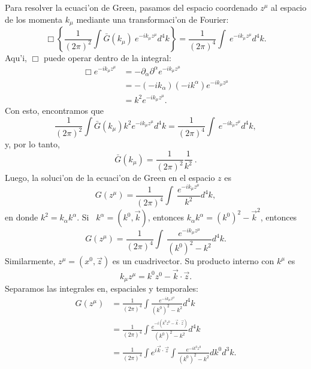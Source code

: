  Para resolver la ecuaci'on de Green, pasamos del espacio
 coordenado $z^\mu $ al espacio de los momenta $k_\mu $ mediante
 una transformaci'on
 de Fourier:%
 \begin{equation}
 \Box\left\{  \frac{1}{(2\pi)
 ^2}\int\bar{G}\left( k_\mu \right)
 ~e^{-ik_\mu z^\mu }d^4k\right\}  =\frac{1}{\left( 2\pi\right)
 ^4}\int~e^{-ik_\mu z^\mu }d^4k.
 \end{equation}
 Aqu'i, $\Box$ puede operar dentro de la integral:%
 \begin{align*}
 \Box e^{-ik_\mu z^\mu }  &
 =-\partial_{\alpha}\partial^{\alpha}e^{-ik_\mu z^\mu }\\
 & =-\left(  -ik_{\alpha}\right)  \left(
 -ik^{\alpha}\right)e^{-ik_\mu z^\mu }\\
 & =k^2e^{-ik_\mu z^\mu }.
 \end{align*}
 Con esto, encontramos que
 \begin{equation}
 \frac{1}{(2\pi)  ^2}\int\bar{G}\left(k_\mu \right)
 k^2e^{-ik_\mu z^\mu }d^4k=\frac{1}{(2\pi)  ^4}%
 \int~e^{-ik_\mu z^\mu }d^4k,
 \end{equation}
 y, por lo tanto,
 \begin{equation}
 \bar{G}\left(  k_\mu \right)  =\frac{1}{(2\pi)
 ^2}\frac {1}{k^2}~.
 \end{equation}
 Luego, la soluci'on de la ecuaci'on de Green en el espacio $z$ es
 \begin{equation}
 G(z^\mu)  =\frac{1}{(2\pi)  ^4}\int
 ~\frac{e^{-ik_\mu z^\mu }}{k^2}d^4k,
 \end{equation}
 en donde $k^2=k_{\alpha}k^{\alpha}$. Si \ $k^{\alpha}=(k^0,\vec{k}) $,
 entonces
 $k_{\alpha}k^{\alpha}=(k^0)^2-\vec{k}^2$, entonces
 \begin{equation}
 G(z^\mu)  =\frac{1}{(2\pi)  ^4}\int
 ~\frac{e^{-ik_\mu z^\mu }}{(k^0)^2-k^2}d^4k.
 \end{equation}
 Similarmente, $z^\mu =(x^0,\vec{z})  $ es un cuadrivector. Su producto interno
 con $k^\mu$ es
 \begin{equation}
 k_\mu z^\mu =k^0z^0-\vec{k}\cdot\vec{z}.
 \end{equation}
 Separamos las integrales en, espaciales y temporales:%
 \begin{align}
 G(z^\mu)    & =\frac{1}{\left(
 2\pi\right)^4}\int\frac{e^{-ik_\mu z^\mu }}{(k^0)^2-k^2}d^4k\nonumber\\
 & =\frac{1}{(2\pi)
 ^4}\int\frac{e^{-i\left(k^0z^0-\vec{k}\cdot\vec{z}\right)
 }}{(k^0)^2-k^2}d^4k\nonumber\\
 & =\frac{1}{(2\pi) ^4}\int e^{i\vec{k}\cdot\vec{z}}\int\frac
 {e^{-ik^0 z^0}}{(k^0)^2-k^2}dk^0d^3k.\label{R-rela02}%
 \end{align}

